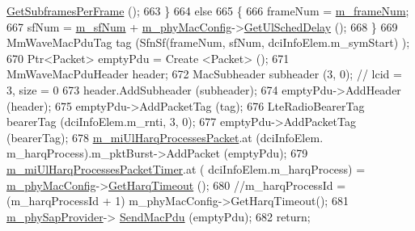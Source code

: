 \begin{DoxyCode}
      \hyperlink{classns3_1_1MmWavePhyMacCommon_a3709cf52f6813eb8ad1af16d95082dc1}{GetSubframesPerFrame} ();
663                                         \}
664                                         \textcolor{keywordflow}{else}
665                                         \{
666                                                 frameNum = \hyperlink{classns3_1_1MmWaveUeMac_aff3b4a35e6f83bd3762e0d1187475717}{m\_frameNum};
667                                                 sfNum = \hyperlink{classns3_1_1MmWaveUeMac_a6502efe66b636fe976c308a9edac3627}{m\_sfNum} + 
      \hyperlink{classns3_1_1MmWaveUeMac_a24c07c6453f442e2e818803190371a46}{m\_phyMacConfig}->\hyperlink{classns3_1_1MmWavePhyMacCommon_afd70935ec71838fefe6a8e18198f19cb}{GetUlSchedDelay} ();
668                                         \}
669                                         MmWaveMacPduTag tag (SfnSf(frameNum, sfNum, dciInfoElem.m\_symStart)
      );
670                                         Ptr<Packet> emptyPdu = Create <Packet> ();
671                                         MmWaveMacPduHeader header;
672                                         MacSubheader subheader (3, 0);  \textcolor{comment}{// lcid = 3, size = 0}
673                                         header.AddSubheader (subheader);
674                                         emptyPdu->AddHeader (header);
675                                         emptyPdu->AddPacketTag (tag);
676                                         LteRadioBearerTag bearerTag (dciInfoElem.m\_rnti, 3, 0);
677                                         emptyPdu->AddPacketTag (bearerTag);
678                                         \hyperlink{classns3_1_1MmWaveUeMac_a53afd2059b620c2f3dd1d9791c4df83c}{m\_miUlHarqProcessesPacket}.at (dciInfoElem.
      m\_harqProcess).m\_pktBurst->AddPacket (emptyPdu);
679                                         \hyperlink{classns3_1_1MmWaveUeMac_af9a65e100f7b9a8e336a40107bfe3844}{m\_miUlHarqProcessesPacketTimer}.at (
      dciInfoElem.m\_harqProcess) = \hyperlink{classns3_1_1MmWaveUeMac_a24c07c6453f442e2e818803190371a46}{m\_phyMacConfig}->\hyperlink{classns3_1_1MmWavePhyMacCommon_a6a3b10cda74091e0579e24e3b4dbad80}{GetHarqTimeout} ();
680                                         \textcolor{comment}{//m\_harqProcessId = (m\_harqProcessId + 1) %
       m\_phyMacConfig->GetHarqTimeout();}
681                                         \hyperlink{classns3_1_1MmWaveUeMac_aac9de0fee7f139e5216613369318a7ce}{m\_phySapProvider}->
      \hyperlink{classns3_1_1MmWavePhySapProvider_ae7f41f77600402396e041eded35999fb}{SendMacPdu} (emptyPdu);
682                                         \textcolor{keywordflow}{return};

\end{DoxyCode}

